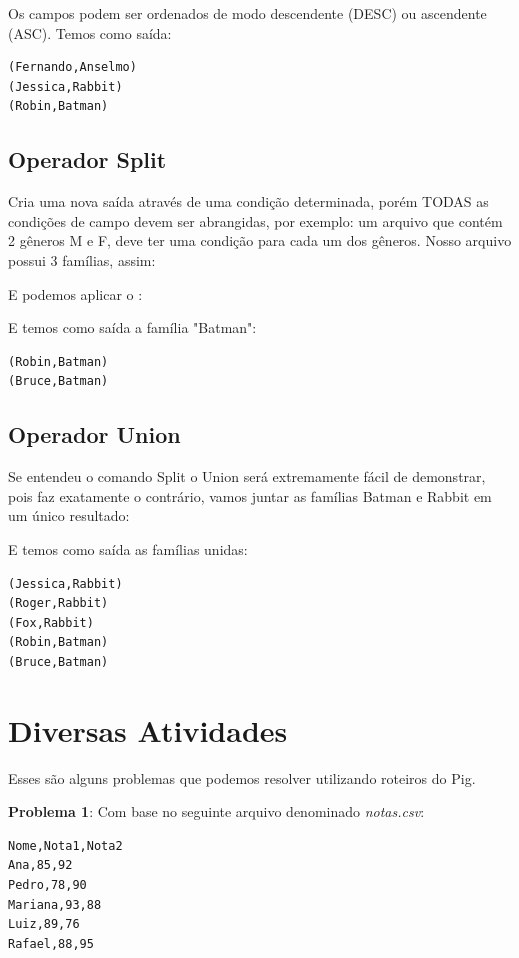 \documentclass[a4paper,11pt]{article}
\begin{document}
Os campos podem ser ordenados de modo descendente (DESC) ou ascendente (ASC). Temos como saída:
\begin{lstlisting}[]
(Fernando,Anselmo)
(Jessica,Rabbit)
(Robin,Batman)
\end{lstlisting}

\subsection{Operador Split}
Cria uma nova saída através de uma condição determinada, porém TODAS as condições de campo devem ser abrangidas, por exemplo: um arquivo que contém 2 gêneros M e F, deve ter uma condição para cada um dos gêneros. Nosso arquivo possui 3 famílias, assim:\\

E podemos aplicar o : \\

E temos como saída a família "Batman":
\begin{lstlisting}[]
(Robin,Batman)
(Bruce,Batman)
\end{lstlisting}

\subsection{Operador Union}
Se entendeu o comando Split o Union será extremamente fácil de demonstrar, pois faz exatamente o contrário, vamos juntar as famílias Batman e Rabbit em um único resultado: \\

E temos como saída as famílias unidas:
\begin{lstlisting}[]
(Jessica,Rabbit)
(Roger,Rabbit)
(Fox,Rabbit)
(Robin,Batman)
(Bruce,Batman)
\end{lstlisting}

\section{Diversas Atividades}
Esses são alguns problemas que podemos resolver utilizando roteiros do Pig.

\textbf{Problema 1}: Com base no seguinte arquivo denominado \textit{notas.csv}:
\begin{lstlisting}[]
Nome,Nota1,Nota2
Ana,85,92
Pedro,78,90
Mariana,93,88
Luiz,89,76
Rafael,88,95
\end{lstlisting}
\end{document}
